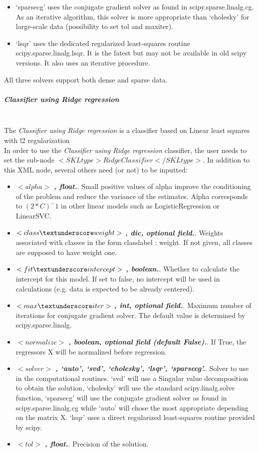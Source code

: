 \begin{itemize}
\begin{itemize}
				\item‘sparse\textunderscore cg’ uses the conjugate gradient solver as found in scipy.sparse.linalg.cg. As an iterative algorithm, this solver is more appropriate than ‘cholesky’ for large-scale data (possibility to set tol and max\textunderscore iter).
				\item‘lsqr’ uses the dedicated regularized least-squares routine scipy.sparse.linalg.lsqr. It is the fatest but may not be available in old scipy versions. It also uses an iterative procedure.
				\end{itemize}
				All three solvers support both dense and sparse data.
\end{itemize}

\subparagraph{Classifier using Ridge regression}
\mbox{}
\\The \textit{Classifier using Ridge regression} is a classifier based on Linear least squares with l2 regularization
\\In order to use the \textit{Classifier using Ridge regression} classifier, the user needs to set the sub-node $<SKLtype>RidgeClassifier</SKLtype>$.
In addition to this XML node, several others need (or not) to be inputted:
\begin{itemize}
  \item $<alpha>$ \textbf{\textit{, float.}}. Small positive values of alpha improve the conditioning of the problem and reduce the variance of the estimates. Alpha corresponds to $(2*C)^-1$ in other linear models such as LogisticRegression or LinearSVC.
  \item $<class\textunderscore weight>$ \textbf{\textit{, dic, optional field.}}. Weights associated with classes in the form {class\textunderscore label : weight}. If not given, all classes are supposed to have weight one.
  \item $<fit\textunderscore intercept>$ \textbf{\textit{, boolean.}}. Whether to calculate the intercept for this model. If set to false, no intercept will be used in calculations (e.g. data is expected to be already centered).
  \item $<max\textunderscore iter>$ \textbf{\textit{, int, optional field.}}. Maximum number of iterations for conjugate gradient solver. The default value is determined by scipy.sparse.linalg.
  \item $<normalize>$ \textbf{\textit{, boolean, optional field (default False).}}. If True, the regressors X will be normalized before regression.
  \item $<solver>$ \textbf{\textit{, {‘auto’, ‘svd’, ‘cholesky’, ‘lsqr’, ‘sparse\textunderscore cg’}.}}. Solver to use in the computational routines. ‘svd’ will use a Singular value decomposition to obtain the solution, ‘cholesky’ will use the standard scipy.linalg.solve function, ‘sparse\textunderscore cg’ will use the conjugate gradient solver as found in scipy.sparse.linalg.cg while ‘auto’ will chose the most appropriate depending on the matrix X. ‘lsqr’ uses a direct regularized least-squares routine provided by scipy.
  \item $<tol>$ \textbf{\textit{, float.}}. Precision of the solution.
\end{itemize}


